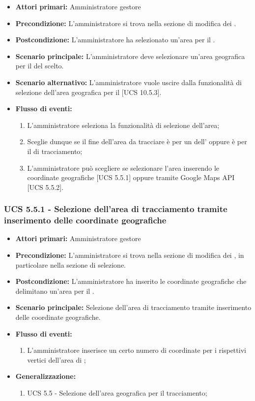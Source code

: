 \begin{itemize}
\item \textbf{Attori primari:} Amministratore gestore
\item \textbf{Precondizione:} L'amministratore si trova nella sezione di modifica dei .
\item \textbf{Postcondizione:} L'amministratore ha selezionato un'area per il .
\item \textbf{Scenario principale:} L'amministratore deve selezionare un'area geografica per il  del  scelto.
\item \textbf{Scenario alternativo:} L'amministratore vuole uscire dalla funzionalità di selezione dell'area geografica per il  [UCS 10.5.3].
\item \textbf{Flusso di eventi:}
\begin{enumerate}
    \item L'amministratore seleziona la funzionalità di selezione dell'area;
    \item Sceglie dunque se il fine dell'area da tracciare è per un  dell' oppure è per il  di tracciamento;
    \item L'amministratore può scegliere se selezionare l'area inserendo le coordinate geografiche [UCS 5.5.1] oppure tramite Google Maps API [UCS 5.5.2].
\end{enumerate}
\end{itemize}

\subsubsection{UCS 5.5.1 - Selezione dell'area di tracciamento tramite inserimento delle coordinate geografiche}%
\begin{itemize}
\item \textbf{Attori primari:} Amministratore gestore
\item \textbf{Precondizione:} L'amministratore si trova nella sezione di modifica dei , in particolare nella sezione di selezione.
\item \textbf{Postcondizione:} L'amministratore ha inserito le coordinate geografiche che delimitano un'area per il .
\item \textbf{Scenario principale:} Selezione dell'area di tracciamento tramite inserimento delle coordinate geografiche.
\item \textbf{Flusso di eventi:}
\begin{enumerate}
    \item L'amministratore inserisce un certo numero di coordinate per i rispettivi vertici dell'area di ;
\end{enumerate}
\item \textbf{Generalizzazione:}
	\begin{enumerate}
        \item UCS 5.5 - Selezione dell'area geografica per il tracciamento;
    \end{enumerate}
\end{itemize}

